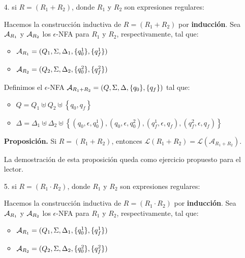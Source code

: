 \begin{enumerate}
    \item[4.] si $R = (R_1 + R_2)$, donde $R_1$ y $R_2$ son expresiones regulares:

        Hacemos la construcción inductiva de $R = (R_1 + R_2)$ por \textbf{inducción}. Sea $\mathcal{A}_{R_1}$ y $\mathcal{A}_{R_2}$ los $\epsilon$-NFA para $R_1$ y $R_2$, respectivamente, tal que:
        \begin{itemize}
            \item $\mathcal{A}_{R_1} = (Q_1, \Sigma, \Delta_1, \{q_0^1\}, \{q_f^1\})$
            \item $\mathcal{A}_{R_2} = (Q_2, \Sigma, \Delta_2, \{q_0^2\}, \{q_f^2\})$
        \end{itemize}

        Definimos el $\epsilon$-NFA $\mathcal{A}_{R_1 +R_2} = (Q, \Sigma, \Delta, \{q_0\}, \{q_f\})$ tal que:
        \begin{itemize}
            \item $Q=Q_1 \uplus Q_2 \uplus\left\{q_0, q_f\right\}$
            \item $\Delta=\Delta_1 \uplus \Delta_2 \uplus\left\{\left(q_0, \epsilon, q_0^1\right),\left(q_0, \epsilon, q_0^2\right),\left(q_f^1, \epsilon, q_f\right),\left(q_f^2, \epsilon, q_f\right)\right\}$
        \end{itemize}

        \textbf{Proposición.} Si $R = (R_1 +R_2)$, entonces $\mathcal{L}\left(R_1+R_2\right)=\mathcal{L}\left(\mathcal{A}_{R_1+R_2}\right)$. \medbreak

        La demostración de esta proposición queda como ejercicio propuesto para el lector.

    \item[5.] si $R = (R_1 \cdot R_2)$, donde $R_1$ y $R_2$ son expresiones regulares:

        Hacemos la construcción inductiva de $R = (R_1 \cdot R_2)$ por \textbf{inducción}. Sea $\mathcal{A}_{R_1}$ y $\mathcal{A}_{R_2}$ los $\epsilon$-NFA para $R_1$ y $R_2$, respectivamente, tal que:
        \begin{itemize}
            \item $\mathcal{A}_{R_1} = (Q_1, \Sigma, \Delta_1, \{q_0^1\}, \{q_f^1\})$
            \item $\mathcal{A}_{R_2} = (Q_2, \Sigma, \Delta_2, \{q_0^2\}, \{q_f^2\})$
        \end{itemize}


\end{enumerate}
